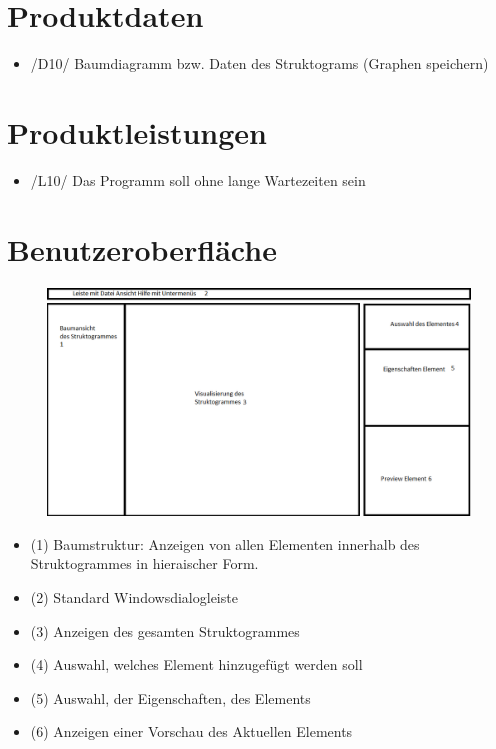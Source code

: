 \documentclass[a4paper,10pt]{report}
\begin{document}
\section{Produktdaten}
\begin{itemize}
\item /D10/ Baumdiagramm bzw. Daten des Struktograms (Graphen speichern)
\end{itemize}
\section{Produktleistungen}
\begin{itemize}
\item /L10/ Das Programm soll ohne lange Wartezeiten sein
\end{itemize}
\section{Benutzeroberfläche}
\begin{figure}[h!]
  \caption{}
  \centering
    \includegraphics[width=1.3\textwidth]{gui-skizze.png}
\end{figure}
\begin{itemize}

\item (1) Baumstruktur: Anzeigen von allen Elementen innerhalb des Struktogrammes in hieraischer Form.
\item (2) Standard Windowsdialogleiste
\item (3) Anzeigen des gesamten Struktogrammes
\item (4) Auswahl, welches Element hinzugefügt werden soll
\item (5) Auswahl, der Eigenschaften, des Elements
\item (6) Anzeigen einer Vorschau des Aktuellen Elements

\end{itemize}
\end{document}
